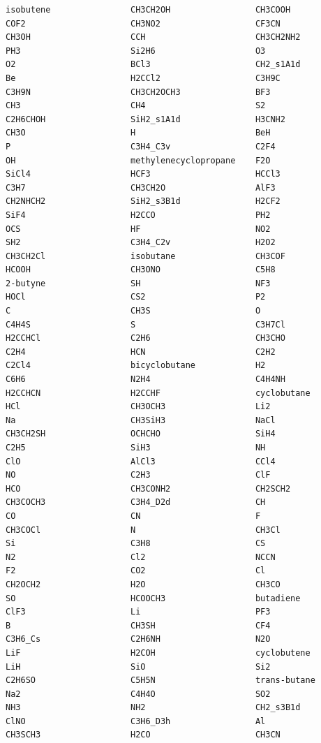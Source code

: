\documentclass[11pt]{article}
\begin{document}
\begin{verbatim}
isobutene                CH3CH2OH                 CH3COOH
COF2                     CH3NO2                   CF3CN
CH3OH                    CCH                      CH3CH2NH2
PH3                      Si2H6                    O3
O2                       BCl3                     CH2_s1A1d
Be                       H2CCl2                   C3H9C
C3H9N                    CH3CH2OCH3               BF3
CH3                      CH4                      S2
C2H6CHOH                 SiH2_s1A1d               H3CNH2
CH3O                     H                        BeH
P                        C3H4_C3v                 C2F4
OH                       methylenecyclopropane    F2O
SiCl4                    HCF3                     HCCl3
C3H7                     CH3CH2O                  AlF3
CH2NHCH2                 SiH2_s3B1d               H2CF2
SiF4                     H2CCO                    PH2
OCS                      HF                       NO2
SH2                      C3H4_C2v                 H2O2
CH3CH2Cl                 isobutane                CH3COF
HCOOH                    CH3ONO                   C5H8
2-butyne                 SH                       NF3
HOCl                     CS2                      P2
C                        CH3S                     O
C4H4S                    S                        C3H7Cl
H2CCHCl                  C2H6                     CH3CHO
C2H4                     HCN                      C2H2
C2Cl4                    bicyclobutane            H2
C6H6                     N2H4                     C4H4NH
H2CCHCN                  H2CCHF                   cyclobutane
HCl                      CH3OCH3                  Li2
Na                       CH3SiH3                  NaCl
CH3CH2SH                 OCHCHO                   SiH4
C2H5                     SiH3                     NH
ClO                      AlCl3                    CCl4
NO                       C2H3                     ClF
HCO                      CH3CONH2                 CH2SCH2
CH3COCH3                 C3H4_D2d                 CH
CO                       CN                       F
CH3COCl                  N                        CH3Cl
Si                       C3H8                     CS
N2                       Cl2                      NCCN
F2                       CO2                      Cl
CH2OCH2                  H2O                      CH3CO
SO                       HCOOCH3                  butadiene
ClF3                     Li                       PF3
B                        CH3SH                    CF4
C3H6_Cs                  C2H6NH                   N2O
LiF                      H2COH                    cyclobutene
LiH                      SiO                      Si2
C2H6SO                   C5H5N                    trans-butane
Na2                      C4H4O                    SO2
NH3                      NH2                      CH2_s3B1d
ClNO                     C3H6_D3h                 Al
CH3SCH3                  H2CO                     CH3CN
\end{verbatim}
\end{document}
